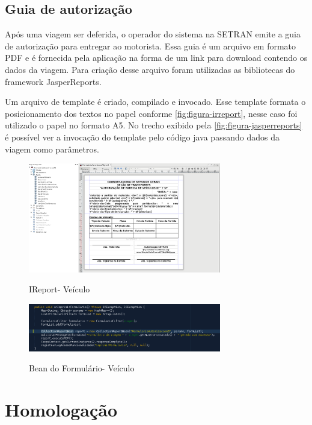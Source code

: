 \subsection{Guia de autorização}
\label{sbs:desenvolvimentoJasper}

Após uma viagem ser deferida, o operador do sistema na SETRAN emite a guia de autorização para entregar ao motorista. Essa guia é um arquivo em formato PDF e é fornecida pela aplicação na forma de um link para download contendo os dados da viagem. Para criação desse arquivo foram utilizadas as bibliotecas do framework JasperReports. 

Um arquivo de template é criado, compilado e invocado. Esse template formata o posicionamento dos textos no papel conforme \autoref{fig:figura-irreport}, nesse caso foi utilizado o papel no formato A5.
No trecho exibido pela \autoref{fig:figura-jasperreports} é possível ver a invocação do template pelo código java passando dados da viagem como parâmetros.

\begin{figure}[!htb]
    \centering
    \caption{IReport- Veículo}
    \includegraphics[width=0.75\textwidth]{dados/figuras/veiculos-ireport.png}
    \label{fig:figura-irreport}
\end{figure}

\begin{figure}[!htb]
    \centering
    \caption{Bean do Formulário- Veículo}
    \includegraphics[width=0.75\textwidth]{dados/figuras/veiculos-jasperreports.png}
    \label{fig:figura-jasperreports}
\end{figure}


\section{Homologação}
\label{sec:atividadesRealizadasHomologacao}

